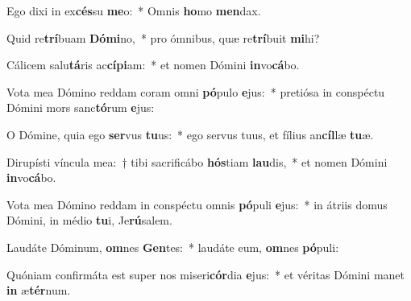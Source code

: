\item Ego dixi in ex\textbf{cés}su \textbf{me}o:~* Omnis \textbf{ho}mo \textbf{men}dax.
\item Quid re\textbf{trí}buam \textbf{Dó}\textbf{mi}no,~* pro ómnibus, quæ re\textbf{trí}buit \textbf{mi}hi?
\item Cálicem salu\textbf{tá}ris ac\textbf{cí}\textbf{pi}am:~* et nomen Dómini \textbf{in}vo\textbf{cá}bo.
\item Vota mea Dómino reddam coram omni \textbf{pó}pulo \textbf{e}jus:~* pretiósa in conspéctu Dómini mors sanc\textbf{tó}rum \textbf{e}jus:
\item O Dómine, quia ego \textbf{ser}vus \textbf{tu}us:~* ego servus tuus, et fílius an\textbf{cíl}læ \textbf{tu}æ.
\item Dirupísti víncula mea:~† tibi sacrificábo \textbf{hós}tiam \textbf{lau}dis,~* et nomen Dómini \textbf{in}vo\textbf{cá}bo.
\item Vota mea Dómino reddam in conspéctu omnis \textbf{pó}puli \textbf{e}jus:~* in átriis domus Dómini, in médio \textbf{tu}i, Je\textbf{rú}salem.
\item Laudáte Dóminum, \textbf{om}nes \textbf{Gen}tes:~* laudáte eum, \textbf{om}nes \textbf{pó}puli:
\item Quóniam confirmáta est super nos miseri\textbf{cór}dia \textbf{e}jus:~* et véritas Dómini manet \textbf{in} æ\textbf{tér}num.
